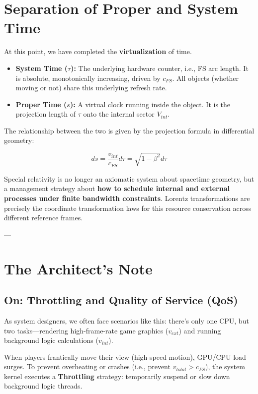 \documentclass[11pt,a4paper,twoside]{book}
\begin{document}
\section{Separation of Proper and System Time}

At this point, we have completed the \textbf{virtualization} of time.

\begin{itemize}
\item \textbf{System Time ($\tau$):} The underlying hardware counter, i.e., FS arc length. It is absolute, monotonically increasing, driven by \textbf{$c_{FS}$}. All objects (whether moving or not) share this underlying refresh rate.

\item \textbf{Proper Time ($s$):} A virtual clock running inside the object. It is the projection length of \textbf{$\tau$} onto the internal sector \textbf{$V_{int}$}.
\end{itemize}

The relationship between the two is given by the projection formula in differential geometry:

$$ds = \frac{v_{int}}{c_{FS}} d\tau = \sqrt{1 - \beta^2} d\tau$$

Special relativity is no longer an axiomatic system about spacetime geometry, but a management strategy about \textbf{how to schedule internal and external processes under finite bandwidth constraints}. Lorentz transformations are precisely the coordinate transformation laws for this resource conservation across different reference frames.

---

\section{The Architect's Note}

\subsection{On: Throttling and Quality of Service (QoS)}

As system designers, we often face scenarios like this: there's only one CPU, but two tasks---rendering high-frame-rate game graphics (\textbf{$v_{ext}$}) and running background logic calculations (\textbf{$v_{int}$}).

When players frantically move their view (high-speed motion), GPU/CPU load surges. To prevent overheating or crashes (i.e., prevent \textbf{$v_{total} > c_{FS}$}), the system kernel executes a \textbf{Throttling} strategy: temporarily suspend or slow down background logic threads.
\end{document}

